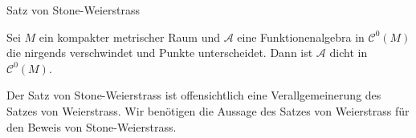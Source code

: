\begin{frame}{Satz von Stone-Weierstrass}
    \begin{satz}
        Sei \(M\) ein kompakter metrischer Raum und \( \mathcal{A} \) eine 
        Funktionenalgebra in \( \mathcal{C}^0(M) \) die nirgends verschwindet und 
        Punkte unterscheidet. 
        Dann ist \( \mathcal{A} \) dicht in \( \mathcal{C}^0(M) \).
    \end{satz}
    \pause
    \begin{bem*}
        Der Satz von Stone-Weierstrass ist offensichtlich eine Verallgemeinerung 
        des Satzes von Weierstrass. 
        Wir benötigen die Aussage des Satzes von Weierstrass für den Beweis von Stone-Weierstrass.
    \end{bem*}
\end{frame}